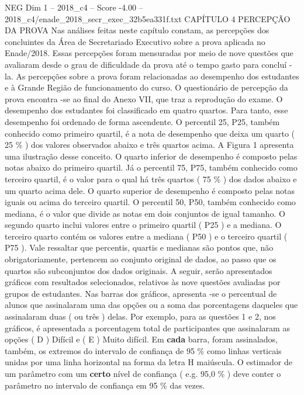 \begin{textsample}{NEG Dim 1 – 2018\_c4 – Score -4.00 – 2018\_c4/enade\_2018\_secr\_exec\_32b5ea331f.txt}  \label{ex:f1_neg_136}
CAPÍTULO 4 PERCEPÇÃO DA PROVA Nas análises feitas neste capítulo constam, as percepções dos concluintes da Área de Secretariado Executivo sobre a prova aplicada no Enade/2018.
Essas percepções foram mensuradas por meio de nove questões que avaliaram desde o grau de dificuldade da prova até o tempo gasto para concluí -la.
As percepções sobre a prova foram relacionadas ao desempenho dos estudantes e à Grande Região de funcionamento do curso.
O questionário de percepção da prova encontra -se ao final do Anexo VII, que traz a reprodução do exame.
O desempenho dos estudantes foi classificado em quatro quartos.
Para tanto, esse desempenho foi ordenado de forma ascendente.
O percentil 25, P25, também conhecido como primeiro quartil, é a nota de desempenho que deixa um quarto ( 25 \% ) dos valores observados abaixo e três quartos acima.
A Figura 1 apresenta uma ilustração desse conceito.
O quarto inferior de desempenho é composto pelas notas abaixo do primeiro quartil.
Já o percentil 75, P75, também conhecido como terceiro quartil, é o valor para o qual há três quartos ( 75 \% ) dos dados abaixo e um quarto acima dele.
O quarto superior de desempenho é composto pelas notas iguais ou acima do terceiro quartil.
O percentil 50, P50, também conhecido como mediana, é o valor que divide as notas em dois conjuntos de igual tamanho.
O segundo quarto inclui valores entre o primeiro quartil ( P25 ) e a mediana.
O terceiro quarto contém os valores entre a mediana ( P50 ) e o terceiro quartil ( P75 ).
Vale ressaltar que percentis, quartis e medianas são pontos que, não obrigatoriamente, pertencem ao conjunto original de dados, ao passo que os quartos são subconjuntos dos dados originais.
A seguir, serão apresentados gráficos com resultados selecionados, relativos às nove questões avaliadas por grupos de estudantes.
Nas barras dos gráficos, apresenta -se o percentual de alunos que assinalaram uma das opções ou a soma das porcentagens daqueles que assinalaram duas ( ou três ) delas.
Por exemplo, para as questões 1 e 2, nos gráficos, é apresentada a porcentagem total de participantes que assinalaram as opções ( D ) Difícil e ( E ) Muito difícil.
Em \textbf{cada} barra, foram assinalados, também, os extremos do intervalo de confiança de 95 \% como linhas verticais unidas por uma linha horizontal na forma da letra H maiúscula.
O estimador de um parâmetro com um \textbf{certo} nível de confiança ( e.g. 95,0 \% ) deve conter o parâmetro no intervalo de confiança em 95 \% das vezes.

\end{textsample}
